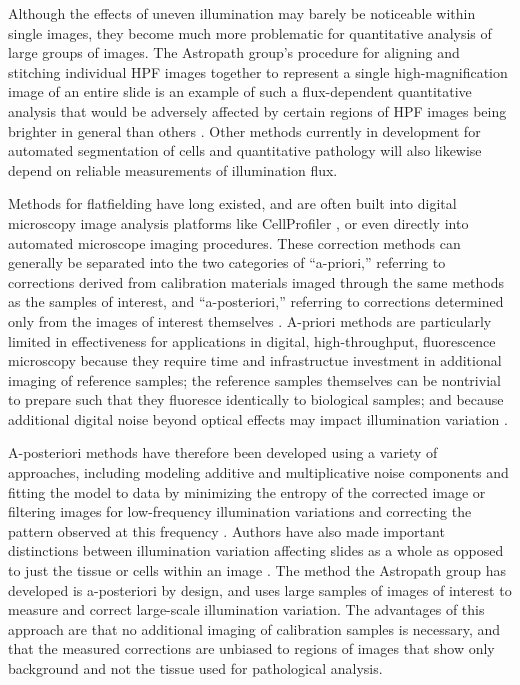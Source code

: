 \documentclass[letterpaper,11pt]{article}
\begin{document}
Although the effects of uneven illumination may barely be noticeable within single images, they become much more problematic for quantitative analysis of large groups of images. The Astropath group's procedure for aligning and stitching individual HPF images together to represent a single high-magnification image of an entire slide is an example of such a flux-dependent quantitative analysis that would be adversely affected by certain regions of HPF images being brighter in general than others \cite{Heshy}. Other methods currently in development for automated segmentation of cells and quantitative pathology will also likewise depend on reliable measurements of illumination flux.

Methods for flatfielding have long existed, and are often built into digital microscopy image analysis platforms like CellProfiler \cite{Carpenter2006}, or even directly into automated microscope imaging procedures. These correction methods can generally be separated into the two categories of ``a-priori,'' referring to corrections derived from calibration materials imaged through the same methods as the samples of interest, and ``a-posteriori,'' referring to corrections determined only from the images of interest themselves \cite{18770694}. A-priori methods are particularly limited in effectiveness for applications in digital, high-throughput, fluorescence microscopy because they require time and infrastructue investment in additional imaging of reference samples; the reference samples themselves can be nontrivial to prepare such that they fluoresce identically to biological samples; and because additional digital noise beyond optical effects may impact illumination variation \cite{doi:10.1111/jmi.12178}.

A-posteriori methods have therefore been developed using a variety of approaches, including modeling additive and multiplicative noise components and fitting the model to data by minimizing the entropy of the corrected image \cite{PMID:10692132} or filtering images for low-frequency illumination variations and correcting the pattern observed at this frequency \cite{Leong619}. Authors have also made important distinctions between illumination variation affecting slides as a whole as opposed to just the tissue or cells within an image \cite{Carpenter2006}. The method the Astropath group has developed is a-posteriori by design, and uses large samples of images of interest to measure and correct large-scale illumination variation. The advantages of this approach are that no additional imaging of calibration samples is necessary, and that the measured corrections are unbiased to regions of images that show only background and not the tissue used for pathological analysis.
\end{document}
